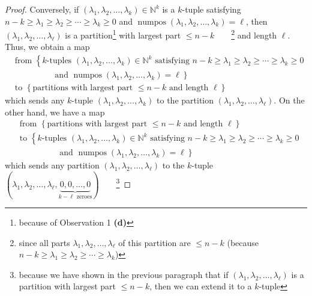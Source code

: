 \begin{proof}
Conversely, if $\left(  \lambda_{1},\lambda_{2},\ldots,\lambda_{k}\right)
\in\mathbb{N}^{k}$ is a $k$-tuple satisfying $n-k\geq\lambda_{1}\geq
\lambda_{2}\geq\cdots\geq\lambda_{k}\geq0$ and $\operatorname*{numpos}\left(
\lambda_{1},\lambda_{2},\ldots,\lambda_{k}\right)  =\ell$, then $\left(
\lambda_{1},\lambda_{2},\ldots,\lambda_{\ell}\right)  $ is a
partition\footnote{because of Observation 1 \textbf{(d)}} with largest part
$\leq n-k$\ \ \ \ \footnote{since all parts $\lambda_{1},\lambda_{2}%
,\ldots,\lambda_{\ell}$ of this partition are $\leq n-k$ (because
$n-k\geq\lambda_{1}\geq\lambda_{2}\geq\cdots\geq\lambda_{k}$)} and length
$\ell$. Thus, we obtain a map%
\begin{align*}
&  \text{from }\left\{  k\text{-tuples }\left(  \lambda_{1},\lambda_{2}%
,\ldots,\lambda_{k}\right)  \in\mathbb{N}^{k}\text{ satisfying }n-k\geq
\lambda_{1}\geq\lambda_{2}\geq\cdots\geq\lambda_{k}\geq0\right. \\
&  \ \ \ \ \ \ \ \ \ \ \ \ \ \ \ \ \ \ \ \ \left.  \text{ and }%
\operatorname*{numpos}\left(  \lambda_{1},\lambda_{2},\ldots,\lambda
_{k}\right)  =\ell\right\} \\
&  \text{to }\left\{  \text{partitions with largest part }\leq n-k\text{ and
length }\ell\right\}
\end{align*}
which sends any $k$-tuple $\left(  \lambda_{1},\lambda_{2},\ldots,\lambda
_{k}\right)  $ to the partition $\left(  \lambda_{1},\lambda_{2}%
,\ldots,\lambda_{\ell}\right)  $. On the other hand, we have a map%
\begin{align*}
&  \text{from }\left\{  \text{partitions with largest part }\leq n-k\text{ and
length }\ell\right\} \\
&  \text{to }\left\{  k\text{-tuples }\left(  \lambda_{1},\lambda_{2}%
,\ldots,\lambda_{k}\right)  \in\mathbb{N}^{k}\text{ satisfying }n-k\geq
\lambda_{1}\geq\lambda_{2}\geq\cdots\geq\lambda_{k}\geq0\right. \\
&  \ \ \ \ \ \ \ \ \ \ \ \ \ \ \ \ \ \ \ \ \left.  \text{ and }%
\operatorname*{numpos}\left(  \lambda_{1},\lambda_{2},\ldots,\lambda
_{k}\right)  =\ell\right\}
\end{align*}
which sends any partition $\left(  \lambda_{1},\lambda_{2},\ldots
,\lambda_{\ell}\right)  $ to the $k$-tuple $\left(  \lambda_{1},\lambda
_{2},\ldots,\lambda_{\ell},\underbrace{0,0,\ldots,0}_{k-\ell\text{ zeroes}%
}\right)  $\ \ \ \ \footnote{because we have shown in the previous paragraph
that if $\left(  \lambda_{1},\lambda_{2},\ldots,\lambda_{\ell}\right)  $ is a
partition with largest part $\leq n-k$, then we can extend it to a $k$-tuple
}
\end{proof}
